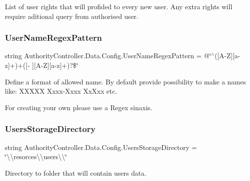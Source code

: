List of user rights that will profided to every new user. Any extra rights will require aditional query from authorised user. 

\mbox{\label{class_authority_controller_1_1_data_1_1_config_a224ad61312be50270d71e0d65633437c}} 
\subsubsection{\texorpdfstring{User\+Name\+Regex\+Pattern}{UserNameRegexPattern}}
{\footnotesize\ttfamily string Authority\+Controller.\+Data.\+Config.\+User\+Name\+Regex\+Pattern = @\char`\"{}$^\wedge$(\mbox{[}A-\/Z\mbox{]}\mbox{[}a-\/z\mbox{]}+)+(\mbox{[}-\/\textquotesingle{} \mbox{]}\mbox{[}A-\/Z\mbox{]}\mbox{[}a-\/z\mbox{]}+)?\$\char`\"{}}



Define a format of allowed name. By default provide possibility to make a names like\+: X\+X\+X\+XX Xxxx-\/\+Xxxx Xx\textquotesingle{}Xxx etc. 

For creating your own please use a Regex sinaxis. \mbox{\label{class_authority_controller_1_1_data_1_1_config_a7572d82972fd94d042784a220f3afef1}} 
\subsubsection{\texorpdfstring{Users\+Storage\+Directory}{UsersStorageDirectory}}
{\footnotesize\ttfamily string Authority\+Controller.\+Data.\+Config.\+Users\+Storage\+Directory = \char`\"{}\textbackslash{}\textbackslash{}resorces\textbackslash{}\textbackslash{}users\textbackslash{}\textbackslash{}\char`\"{}}



Directory to folder that will contain users data. 



